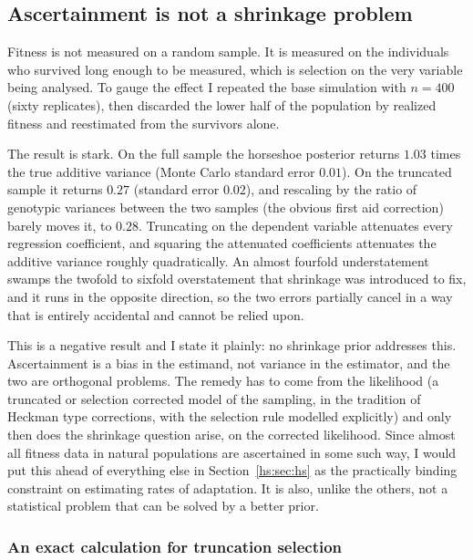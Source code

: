 \subsection{Ascertainment is not a shrinkage problem}

Fitness is not measured on a random sample. It is measured on the individuals who survived long enough to be measured, which is selection on the very variable being analysed. To gauge the effect I repeated the base simulation with $n = 400$ (sixty replicates), then discarded the lower half of the population by realized fitness and reestimated from the survivors alone.

The result is stark. On the full sample the horseshoe posterior returns $1.03$ times the true additive variance (Monte Carlo standard error $0.01$). On the truncated sample it returns $0.27$ (standard error $0.02$), and rescaling by the ratio of genotypic variances between the two samples (the obvious first aid correction) barely moves it, to $0.28$. Truncating on the dependent variable attenuates every regression coefficient, and squaring the attenuated coefficients attenuates the additive variance roughly quadratically. An almost fourfold understatement swamps the twofold to sixfold overstatement that shrinkage was introduced to fix, and it runs in the opposite direction, so the two errors partially cancel in a way that is entirely accidental and cannot be relied upon.

This is a negative result and I state it plainly: no shrinkage prior addresses this. Ascertainment is a bias in the estimand, not variance in the estimator, and the two are orthogonal problems. The remedy has to come from the likelihood (a truncated or selection corrected model of the sampling, in the tradition of Heckman type corrections, with the selection rule modelled explicitly) and only then does the shrinkage question arise, on the corrected likelihood. Since almost all fitness data in natural populations are ascertained in some such way, I would put this ahead of everything else in Section~\ref{hs:sec:hs} as the practically binding constraint on estimating rates of adaptation. It is also, unlike the others, not a statistical problem that can be solved by a better prior.

\subsubsection*{An exact calculation for truncation selection}


